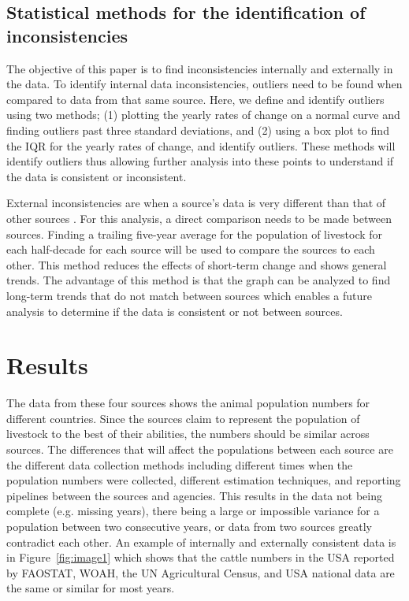 \documentclass{article}
\begin{document}
\subsection{Statistical methods for the identification of inconsistencies}
The objective of this paper is to find inconsistencies internally and externally in the data. To identify internal data inconsistencies, outliers need to be found when compared to data from that same source\citep{FasterCapital}. Here, we define and identify outliers using two methods; (1) plotting the yearly rates of change on a normal curve and finding outliers past three standard deviations, and (2) using a box plot to find the IQR for the yearly rates of change, and identify outliers. These methods will identify outliers thus allowing further analysis into these points to understand if the data is consistent or inconsistent. 

External inconsistencies are when a source’s data is very different than that of other sources \citep{lyles_validation_2011}. For this analysis, a direct comparison needs to be made between sources. Finding a trailing five-year average for the population of livestock for each half-decade for each source will be used to compare the sources to each other. This method reduces the effects of short-term change and shows general trends. The advantage of this method is that the graph can be analyzed to find long-term trends that do not match between sources which enables a future analysis to determine if the data is consistent or not between sources.

\section{Results}
The data from these four sources shows the animal population numbers for different countries. Since the sources claim to represent the population of livestock to the best of their abilities, the numbers should be similar across sources. The differences that will affect the populations between each source are the different data collection methods including different times when the population numbers were collected, different estimation techniques, and reporting pipelines between the sources and agencies. This results in the data not being complete (e.g. missing years), there being a large or impossible variance for a population between two consecutive years, or data from two sources greatly contradict each other. An example of internally and externally consistent data is in Figure~\ref{fig:image1} which shows that the cattle numbers in the USA reported by FAOSTAT, WOAH, the UN Agricultural Census, and USA national data are the same or similar for most years. 
\end{document}
